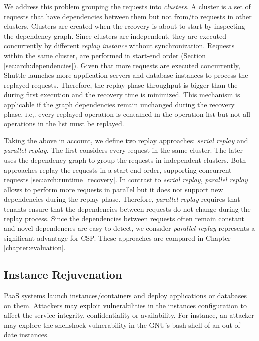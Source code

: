 We address this problem grouping the requests into \emph{clusters}. A cluster is a set of requests that have dependencies between them but not from/to requests in other clusters. Clusters are created when the recovery is about to start by inspecting the dependency graph. Since clusters are independent, they are executed concurrently by different \emph{replay instance} without synchronization. Requests within the same cluster, are performed in start-end order (Section \ref{sec:arch:dependencies}). Given that more requests are executed concurrently, Shuttle launches more application servers and database instances to process the replayed requests. Therefore, the replay phase throughput is bigger than the during first execution and the recovery time is minimized. This mechanism is applicable if the graph dependencies remain unchanged during the recovery phase, i.e,. every replayed operation is contained in the operation list but not all operations in the list must be replayed.

Taking the above in account, we define two replay approaches: \emph{serial replay} and \emph{parallel replay}. The first considers every request in the same cluster. The later uses the dependency graph to group the requests in independent clusters. Both approaches replay the requests in a start-end order, supporting concurrent requests \ref{sec:arch:runtime_recovery}. In contrast to \emph{serial replay}, \emph{parallel replay} allows to perform more requests in parallel but it does not support new dependencies during the replay phase. Therefore, \emph{parallel replay} requires that tenants ensure that the dependencies between requests do not change during the replay process. Since the dependencies between requests often remain constant and novel dependencies are easy to detect, we consider \emph{parallel replay} represents a significant advantage for \acf{CSP}. These approaches are compared in Chapter \ref{chapter:evaluation}.




\subsection{Instance Rejuvenation}
\label{sec:arch:image_rejuvenation}

\ac{PaaS} systems launch instances/containers and deploy applications or databases on them. Attackers may exploit vulnerabilities in the instances configuration to affect the service integrity, confidentiality or availability. For instance, an attacker may explore the shellshock vulnerability in the GNU's bash shell of an out of date instances.

